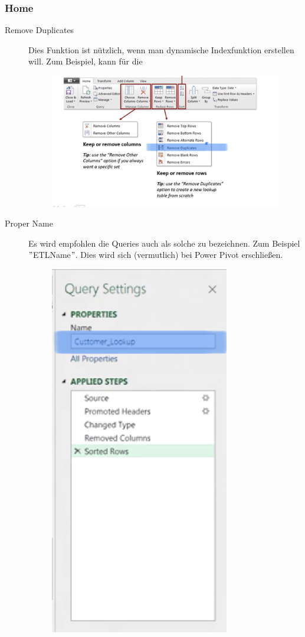\subsubsection{Home}
\begin{description}
\item[Remove Duplicates] Dies Funktion ist nützlich, wenn man dynamische Indexfunktion erstellen will. Zum Beispiel, kann für die 
\begin{figure}[H]
	\centering
	\includegraphics[scale = 0.3]{attachment/chapter_1/screenshot022}
	\caption{}
	\label{fig:screenshot022}
\end{figure}
\item[Proper Name] Es wird empfohlen die Queries auch als solche zu bezeichnen. Zum Beispiel $"$ETLName$"$. Dies wird sich (vermutlich) bei Power Pivot erschließen.
\begin{figure}[H]
	\centering
	\includegraphics[scale = 0.3]{attachment/chapter_1/screenshot023}
	\caption{}
	\label{fig:screenshot023}
\end{figure}
\end{description}
